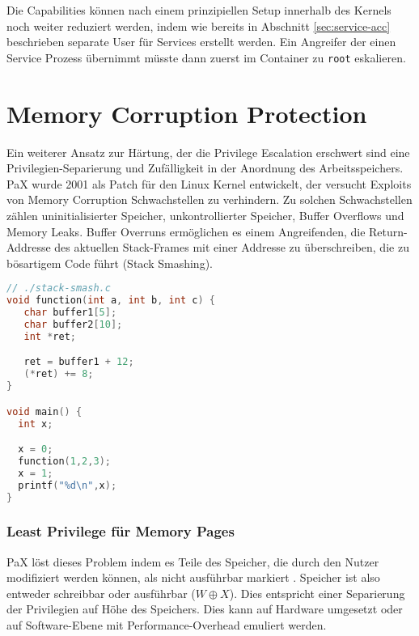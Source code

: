 Die Capabilities können nach einem prinzipiellen Setup innerhalb des Kernels noch weiter reduziert werden, indem wie bereits in Abschnitt \ref{sec:service-acc} beschrieben separate User für Services erstellt werden. Ein Angreifer der einen Service Prozess übernimmt müsste dann zuerst im Container zu \texttt{root} eskalieren.  



\section{Memory Corruption Protection}

Ein weiterer Ansatz zur Härtung, der die Privilege Escalation erschwert sind eine Privilegien-Separierung und Zufälligkeit in der Anordnung des Arbeitsspeichers. PaX wurde 2001 als Patch für den Linux Kernel entwickelt, der versucht Exploits von Memory Corruption Schwachstellen zu verhindern. Zu solchen Schwachstellen zählen uninitialisierter Speicher, unkontrollierter Speicher, Buffer Overflows und Memory Leaks. 
Buffer Overruns ermöglichen es einem Angreifenden, die Return-Addresse des aktuellen Stack-Frames mit einer Addresse zu überschreiben, die zu bösartigem Code führt (Stack Smashing). 

\begin{lstlisting}[language=c,caption={Stack Smashing, das ein Überspringen der \texttt{x = 1} Instruktion bewirkt. Aus \cite{alpeh1996smashing}}]
// ./stack-smash.c
void function(int a, int b, int c) {
   char buffer1[5];
   char buffer2[10];
   int *ret;

   ret = buffer1 + 12;
   (*ret) += 8;
}

void main() {
  int x;

  x = 0;
  function(1,2,3);
  x = 1;
  printf("%d\n",x);
}
\end{lstlisting}


\subsubsection{Least Privilege für Memory Pages}
\label{sec:mem-sec}

PaX löst dieses Problem indem es Teile des Speicher, die durch den Nutzer modifiziert werden können, als nicht ausführbar markiert \cite{shacham_2004}. Speicher ist also entweder schreibbar oder ausführbar ($W \oplus X$). Dies entspricht einer Separierung der Privilegien auf Höhe des Speichers. Dies kann auf Hardware umgesetzt oder auf Software-Ebene mit Performance-Overhead emuliert werden.

